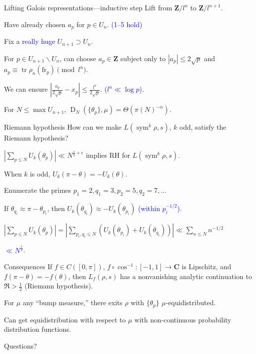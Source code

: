 \documentclass[handout]{beamer}
\DeclareMathOperator{\D}{D}
\DeclareMathOperator{\sym}{sym}
\DeclareMathOperator{\tr}{tr}
\newcommand{\bC}{\mathbf{C}}
\newcommand{\bZ}{\mathbf{Z}}
\newcommand{\frob}{\mathrm{fr}}
\begin{document}
\begin{frame}{Lifting Galois representations---inductive step}
Lift from $\bZ/l^n$ to $\bZ/l^{n+1}$. 
\pause

Have already chosen $a_p$ for $p\in U_n$. 
\pause
\textcolor{blue}{(1--5 hold)}
\pause

Fix a \textcolor{blue}{really huge} $U_{n+1}\supset U_n$.
\pause

For $p\in U_{n+1}\smallsetminus U_n$, can choose $a_p\in \bZ$ subject only to 
$|a_p| \leqslant 2\sqrt p$ and $a_p \equiv \tr\rho_n(\frob_p)\pmod{l^n}$. 
\pause

We can ensure 
$\left| \frac{a_p}{2\sqrt p} - x_p\right| \leqslant \frac{l^n}{2\sqrt p}$.
\pause
\textcolor{blue}{($l^n \ll \log p$)}.
\pause

For $N\leqslant \max U_{n+1}$, $\D_N(\{\theta_p\},\mu) = \Theta(\pi(N)^{-\alpha})$. 
\pause
\end{frame}


\begin{frame}{Riemann hypothesis}
How can we make $L(\sym^k \rho,s)$, $k$ odd, satisfy the Riemann hypothesis?
\pause

$\left|\sum_{p\leqslant N} U_k(\theta_p)\right| \ll N^{\frac 1 2+\epsilon}$ implies 
RH for $L(\sym^k \rho,s)$. 
\pause

When $k$ is odd, $U_k(\pi-\theta) = -U_k(\theta)$. 
\pause

Enumerate the primes $p_1 = 2, q_1 = 3, p_2 = 5, q_2 = 7,\dots$
\pause

If $\theta_{q_i} \approx \pi - \theta_{p_i}$, then 
$U_k(\theta_{q_i}) \approx - U_k(\theta_{p_i})$ 
\pause
\textcolor{blue}{(within $p_i^{-1/2}$)}. 
\pause

$\left|\sum_{p\leqslant N} U_k(\theta_p)\right| = \left| \sum_{p_i,q_i\leqslant N} \left(U_k(\theta_{p_i}) + U_k(\theta_{q_i})\right)\right| \ll \sum_{n\leqslant N} n^{-1/2}$
\pause

\textcolor{blue}{$\ll N^{\frac 1 2}$}. 
\end{frame}


\begin{frame}{Consequences}
If $f\in C([0,\pi])$, $f\circ \cos^{-1}\colon [-1,1]\to \bC$ is Lipschitz, and 
$f(\pi-\theta) = - f(\theta)$, then $L_f(\rho,s)$ has a nonvanishing analytic 
continuation to $\Re > \frac 1 2$ (Riemann hypothesis). 
\pause

For $\mu$ any ``bump measure,'' there exits $\rho$ with $\{\theta_p\}$ 
$\mu$-equidistributed. 
\pause

Can get equidistribution with respect to $\mu$ with non-continuous probability 
distribution functions.
\end{frame}





\begin{frame}
\begin{center}
\Huge Questions?
\end{center}
\end{frame}
\end{document}
